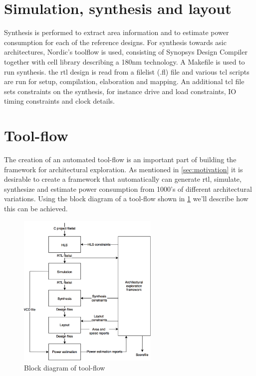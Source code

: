 \section{Simulation, synthesis and layout}
Synthesis is performed to extract area information and to estimate power consumption for each of the reference designs. For synthesis towards \gls{asic} architectures, Nordic's toolflow is used, consisting of Synopsys Design Compiler \cite{syndescomp} together with cell library describing a 180nm technology. A Makefile is used to run synthesis. the \gls{rtl} design is read from a filelist (.fl) file and various \gls{tcl} scripts are run for setup, compilation, elaboration and mapping. An additional \gls{tcl} file sets constraints on the synthesis, for instance drive and load constraints, IO timing constraints and clock details.
\section{Tool-flow}
The creation of an automated tool-flow is an important part of building the framework for architectural exploration.  As mentioned in \cref{sec:motivation} it is desirable to create a framework that automatically can generate \gls{rtl}, simulate, synthesize and estimate power consumption from 1000's of different architectural variations. Using the block diagram of a tool-flow shown in \cref{fig:toolflowblock} we'll describe how this can be achieved. 
\begin{figure}[hbpt]
\centering
\includegraphics[width=0.6\textwidth]{../figs/Toolflow.png}
\caption{\label{fig:toolflowblock}Block diagram of tool-flow}
\end{figure}
